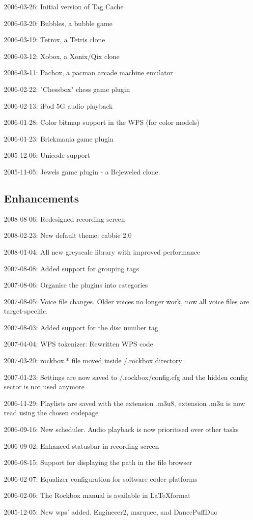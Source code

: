 \begin{changelog}
\item 2006-03-26: Initial version of Tag Cache
\item 2006-03-20: Bubbles, a bubble game
\item 2006-03-19: Tetrox, a Tetris clone
\item 2006-03-12: Xobox, a Xonix/Qix clone
\item 2006-03-11: Pacbox, a pacman arcade machine emulator
\item 2006-02-22: "Chessbox" chess game plugin
\item 2006-02-13: iPod 5G audio playback
\item 2006-01-28: Color bitmap support in the WPS (for color models)
\item 2006-01-23: Brickmania game plugin
\item 2005-12-06: Unicode support
\item 2005-11-05: Jewels game plugin - a Bejeweled clone.
\end{changelog}

\subsection{Enhancements}
\begin{changelog}
\item 2008-08-06: Redesigned recording screen
\item 2008-02-23: New default theme: cabbie 2.0
\item 2008-01-04: All new greyscale library with improved performance
\item 2007-08-08: Added support for grouping tags
\item 2007-08-06: Organise the plugins into categories
\item 2007-08-05: Voice file changes. Older voices no longer work, now
  all voice files are target-specific.
\item 2007-08-03: Added support for the disc number tag
\item 2007-04-04: WPS tokenizer: Rewritten WPS code
\item 2007-03-20: rockbox.* file moved inside /.rockbox directory
\item 2007-01-23: Settings are now saved to /.rockbox/config.cfg and
  the hidden config sector is not used anymore
\item 2006-11-29: Playlists are saved with the extension .m3u8,
  extension .m3u is now read using the chosen codepage
\item 2006-09-16: New scheduler. Audio playback is now prioritised
  over other tasks
\item 2006-09-02: Enhanced statusbar in recording screen
\item 2006-08-15: Support for displaying the path in the file browser
\item 2006-02-07: Equalizer configuration for software codec platforms
\item 2006-02-06: The Rockbox manual is available in \LaTeX format
\item 2005-12-05: New wps' added. Engineeer2, marquee, and DancePuffDuo
\end{changelog}

